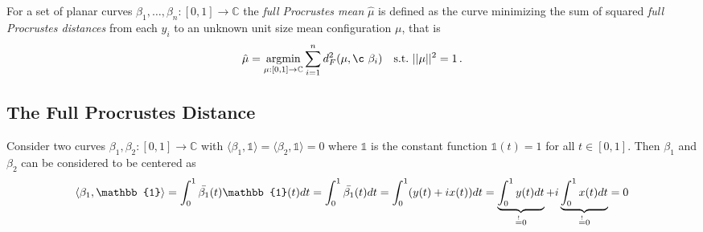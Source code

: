 For a set of planar curves $\beta_1,\dots,\beta_n : [0,1] \rightarrow \mathbb{C}$ the \textit{full Procrustes mean} $\hat{\mu}$ is defined as the curve minimizing the sum of squared \textit{full Procrustes distances} from each $y_i$ to an unknown unit size mean configuration $\mu$, that is
$$ \hat{\mu} = \argmin_{\mu:[0,1]\rightarrow\mathbb{C}} \sum_{i=1}^n d^2_F(\mu,¸\beta_i) 
  \quad\text{s.t.}\,\, ||\mu||^2 = 1\,.$$

\subsection{The Full Procrustes Distance}
Consider two curves $\beta_1, \beta_2 : [0,1] \rightarrow \mathbb{C}$ with $\langle \beta_1, \mathbb{1} \rangle = \langle \beta_2, \mathbb{1} \rangle = 0$ where $\mathbb{1}$ is the constant function $\mathbb{1}(t) = 1$ for all $t \in [0,1]$.
Then $\beta_1$ and $\beta_2$ can be considered to be centered as
$$ \langle \beta_1, \mathbb{1} \rangle 
  = \int_0^1 \bar{\beta_1}(t)\mathbb{1}(t)dt\\
  = \int_0^1 \bar{\beta_1}(t)dt 
  = \int_0^1 (y(t) + i x(t))dt
  = \underbrace{\int_0^1 y(t)dt}_{\stackrel{!}{=}0} + i \underbrace{\int_0^1 x(t)dt}_{\stackrel{!}{=}0} = 0 $$

